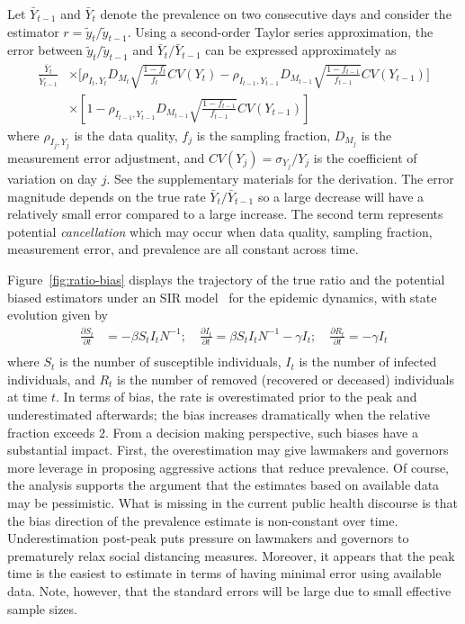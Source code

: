 \documentclass[12pt]{article}
\begin{document}
Let $\bar Y_{t-1}$ and $\bar Y_{t}$ denote the prevalence on two consecutive days and consider the estimator $r = \tilde y_t / \tilde y_{t-1}$.  Using a second-order Taylor series approximation, the error between ${\tilde y_t}/{\tilde y_{t-1}}$ and ${\bar Y_{t}}/{\bar Y_{t-1}}$ can be expressed approximately as
$$
\begin{aligned}
\frac{\bar Y_t}{\bar Y_{t-1}} &\times \bigg[ \rho_{I_t,Y_t} D_{M_t} \sqrt{\frac{1-f_t}{f_t}} CV (Y_t)  -\rho_{I_{t-1},Y_{t-1}} D_{M_{t-1}} \sqrt{\frac{1-f_{t-1}}{f_{t-1}}} CV (Y_{t-1}) \bigg] \\
&\times \left[ 1 - \rho_{I_{t-1},Y_{t-1}} D_{M_{t-1}} \sqrt{\frac{1-f_{t-1}}{f_{t-1}}} CV (Y_{t-1}) \right]
\end{aligned}
$$
where $\rho_{I_j, Y_j}$ is the data quality, $f_j$ is the sampling fraction, $D_{M_j}$ is the measurement error adjustment, and $CV(Y_j) = \sigma_{Y_j}/Y_j$ is the coefficient of variation on day $j$.  See the supplementary materials for the derivation. The error magnitude depends on the true rate $\bar Y_{t} / \bar Y_{t-1}$ so a large decrease will have a relatively small error compared to a large increase. The second term represents potential \emph{cancellation} which may occur when data quality, sampling fraction, measurement error, and prevalence are all constant across time.

Figure~\ref{fig:ratio-bias} displays the trajectory of the true ratio and the potential biased estimators under an SIR model~\cite{Pastor2001,Newman2002,Parshani2010} for the epidemic dynamics, with state evolution given by
$$
\begin{aligned}
\frac{\partial S_t}{\partial t} &= - \beta S_t I_t N^{-1}; \quad
\frac{\partial I_t}{\partial t} = \beta S_t I_t N^{-1} - \gamma I_t; \quad
\frac{\partial R_t}{\partial t} = - \gamma I_t \\
\end{aligned}
$$
where $S_t$ is the number of susceptible individuals, $I_t$ is the number of infected individuals, and $R_t$ is the number of removed (recovered or deceased) individuals at time $t$.  In terms of bias, the rate is overestimated prior to the peak and underestimated afterwards; the bias increases dramatically when the relative fraction exceeds $2$.  From a decision making perspective, such biases have a substantial impact.  First, the overestimation may give lawmakers and governors more leverage in proposing aggressive actions that reduce prevalence.  Of course, the analysis supports the argument that the estimates based on available data may be pessimistic. What is missing in the current public health discourse is that the bias direction of the prevalence estimate is non-constant over time.   Underestimation post-peak puts pressure on lawmakers and governors to prematurely relax social distancing measures.  Moreover, it appears that the peak time is the easiest to estimate in terms of having minimal error using available data.  Note, however, that the standard errors will be large due to small effective sample sizes.
\end{document}
